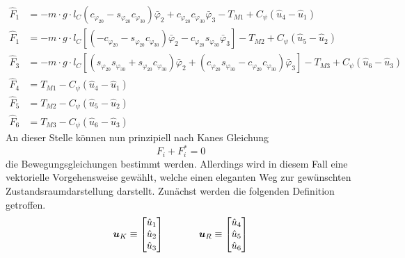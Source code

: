 \begin{align}
\hat{F}_1 &= -m\cdot g\cdot l_C (c_{\varphi_{20}}-s_{\varphi_{20}}c_{\varphi_{30}})\bar{\varphi}_2 + c_{\varphi_{20}}c_{\varphi_{30}}\bar{\varphi}_3 - T_{M1} + C_{\psi}(\hat{u}_4 - \hat{u}_1) 
\\
\hat{F}_1 &= -m\cdot g\cdot l_C [(-c_{\varphi_{20}}-s_{\varphi_{20}}c_{\varphi_{30}})\bar{\varphi}_2 - c_{\varphi_{20}}s_{\varphi_{30}}\bar{\varphi}_3 ] - T_{M2} + C_{\psi}(\hat{u}_5 - \hat{u}_2)
\\
\hat{F}_3 &= -m\cdot g\cdot l_C [(s_{\varphi_{20}}s_{\varphi_{30}}+s_{\varphi_{20}}c_{\varphi_{30}})\bar{\varphi}_2 + (c_{\varphi_{20}}s_{\varphi_{30}} - c_{\varphi_{20}}c_{\varphi_{30}})\bar{\varphi}_3] - T_{M3} + C_{\psi}(\hat{u}_6 - \hat{u}_3)
\\
\hat{F}_4 &= T_{M1} - C_{\psi}(\hat{u}_4 - \hat{u}_1)
\\
\hat{F}_5 &= T_{M2} - C_{\psi}(\hat{u}_5 - \hat{u}_2)
\\
\hat{F}_6 &= T_{M3} - C_{\psi}(\hat{u}_6 - \hat{u}_3)
\end{align}
An dieser Stelle können nun prinzipiell nach Kanes Gleichung
\begin{equation}
F_i + F^*_i = 0
\end{equation}
die Bewegungsgleichungen bestimmt werden. Allerdings wird in diesem Fall eine vektorielle Vorgehensweise gewählt, welche einen eleganten Weg zur gewünschten Zustandsraumdarstellung darstellt. Zunächst werden die folgenden Definition getroffen.
\begin{equation}
\boldsymbol{u}_K \equiv \begin{bmatrix} \hat{u}_1 \\ \hat{u}_2 \\ \hat{u}_3 \end{bmatrix}
\hspace{35pt}
\boldsymbol{u}_R \equiv \begin{bmatrix} \hat{u}_4 \\ \hat{u}_5 \\ \hat{u}_6 \end{bmatrix}
\end{equation}
